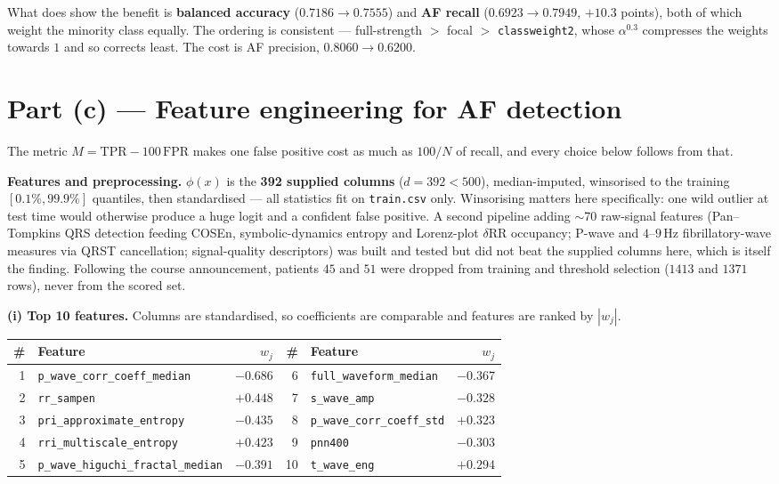 \documentclass[10pt,a4paper]{article}
\newcommand{\feat}[1]{\texttt{\small #1}}
\begin{document}
What does show the benefit is \textbf{balanced accuracy} ($0.7186 \to 0.7555$)
and \textbf{AF recall} ($0.6923 \to 0.7949$, $+10.3$ points), both of which weight
the minority class equally. The ordering is consistent --- full-strength $>$ focal
$>$ \texttt{classweight2}, whose $\alpha^{0.3}$ compresses the weights towards $1$
and so corrects least. The cost is AF precision, $0.8060 \to 0.6200$.

\section*{Part (c) --- Feature engineering for AF detection}

The metric $M = \mathrm{TPR} - 100\,\mathrm{FPR}$ makes one false positive cost as
much as $100/N$ of recall, and every choice below follows from that.

\textbf{Features and preprocessing.} $\phi(x)$ is the \textbf{392 supplied
columns} ($d = 392 < 500$), median-imputed, winsorised to the training
$[0.1\%, 99.9\%]$ quantiles, then standardised --- all statistics fit on
\texttt{train.csv} only. Winsorising matters here specifically: one wild outlier
at test time would otherwise produce a huge logit and a confident false positive.
A second pipeline adding $\sim$70 raw-signal features (Pan--Tompkins QRS
detection feeding COSEn, symbolic-dynamics entropy and Lorenz-plot $\delta$RR
occupancy; P-wave and $4$--$9$\,Hz fibrillatory-wave measures via QRST
cancellation; signal-quality descriptors) was built and tested but did not beat
the supplied columns here, which is itself the finding. Following the course
announcement, patients $45$ and $51$ were dropped from training and threshold
selection ($1413$ and $1371$ rows), never from the scored set.

\textbf{(i) Top 10 features.} Columns are standardised, so coefficients are
comparable and features are ranked by $|w_j|$.

\begin{table}[h]
\centering\footnotesize
\begin{tabular}{@{}rlr@{\hskip 16pt}rlr@{}}
\toprule
\# & \textbf{Feature} & $w_j$ & \# & \textbf{Feature} & $w_j$ \\
\midrule
1 & \feat{p\_wave\_corr\_coeff\_median}      & $-0.686$ & 6  & \feat{full\_waveform\_median}    & $-0.367$ \\
2 & \feat{rr\_sampen}                        & $+0.448$ & 7  & \feat{s\_wave\_amp}              & $-0.328$ \\
3 & \feat{pri\_approximate\_entropy}         & $-0.435$ & 8  & \feat{p\_wave\_corr\_coeff\_std} & $+0.323$ \\
4 & \feat{rri\_multiscale\_entropy}          & $+0.423$ & 9  & \feat{pnn400}                    & $-0.303$ \\
5 & \feat{p\_wave\_higuchi\_fractal\_median} & $-0.391$ & 10 & \feat{t\_wave\_eng}              & $+0.294$ \\
\bottomrule
\end{tabular}
\end{table}
\end{document}
